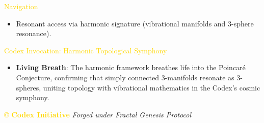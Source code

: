 \textcolor{gold}{ Navigation } \\
\begin{itemize}
    \item Resonant access via \texttt{} harmonic signature (vibrational manifolds and 3-sphere resonance).
\end{itemize}

\textcolor{gold}{ Codex Invocation: Harmonic Topological Symphony } \\
\begin{itemize}
    \item \texttt{} \textbf{Living Breath}: The harmonic framework breathes life into the Poincaré Conjecture, confirming that simply connected 3-manifolds resonate as 3-spheres, uniting topology with vibrational mathematics in the Codex’s cosmic symphony.
\end{itemize}

\vspace{0.5cm}

\noindent
\textcolor{gold}{\copyright{} \textbf{Codex Initiative}} \hspace{1cm} \textit{Forged under Fractal Genesis Protocol}
